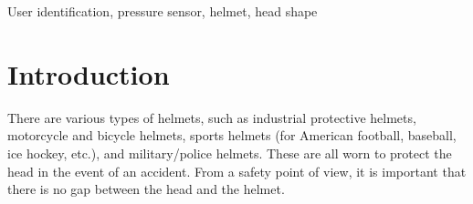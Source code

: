 \documentclass[english,preprint,JIP]{ipsj}
\begin{document}
\begin{abstract}
\end{abstract}

\begin{keyword}
User identification, pressure sensor, helmet, head shape
\end{keyword}

\maketitle

\section{Introduction}
\label{sec:introduction}
There are various types of helmets, such as industrial protective helmets, motorcycle and bicycle helmets, sports helmets (for American football, baseball, ice hockey, etc.), and military/police helmets. These are all worn to protect the head in the event of an accident\cite{helmet}. From a safety point of view, it is important that there is no gap between the head and the helmet.\par
\end{document}
